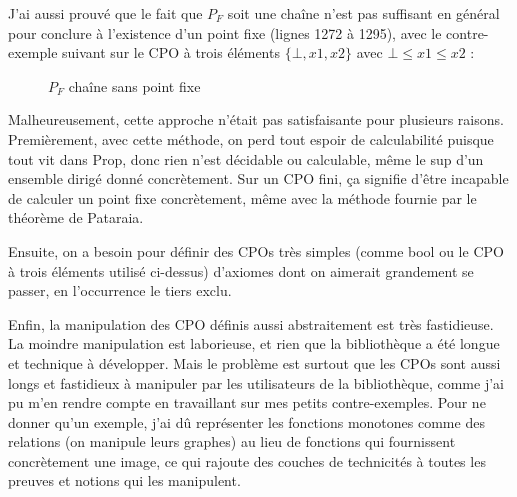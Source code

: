 \documentclass{article}
\newcommand\code[1]{{\fontfamily{lmtt}\selectfont #1}}
\theoremstyle{definition}
\begin{document}
J'ai aussi prouvé que le fait que $P_F$ soit une chaîne n'est pas suffisant en général pour conclure à l'existence d'un point fixe (lignes 1272 à 1295), avec le contre-exemple suivant sur le CPO à trois éléments $\{\bot, x1, x2 \}$ avec $\bot \leq x1 \leq x2$ :

\begin{figure}[ht]
\centering
\resizebox{0.09\linewidth}{!}
	{
	}
\caption{$P_F$ chaîne sans point fixe}
\end{figure}

\bigskip

Malheureusement, cette approche n'était pas satisfaisante pour plusieurs raisons. Premièrement, avec cette méthode, on perd tout espoir de calculabilité puisque tout vit dans \code{Prop}, donc rien n'est décidable ou calculable, même le sup d'un ensemble dirigé donné concrètement. Sur un CPO fini, ça signifie d'être incapable de calculer un point fixe concrètement, même avec la méthode fournie par le théorème de Pataraia.

Ensuite, on a besoin pour définir des CPOs très simples (comme \code{bool} ou le CPO à trois éléments utilisé ci-dessus) d'axiomes dont on aimerait grandement se passer, en l'occurrence le tiers exclu.

Enfin, la manipulation des CPO définis aussi abstraitement est très fastidieuse. La moindre manipulation est laborieuse, et rien que la bibliothèque a été longue et technique à développer. Mais le problème est surtout que les CPOs sont aussi longs et fastidieux à manipuler par les utilisateurs de la bibliothèque, comme j'ai pu m'en rendre compte en travaillant sur mes petits contre-exemples. Pour ne donner qu'un exemple, j'ai dû représenter les fonctions monotones comme des relations (on manipule leurs graphes) au lieu de fonctions qui fournissent concrètement une image, ce qui rajoute des couches de technicités à toutes les preuves et notions qui les manipulent.
\end{document}
